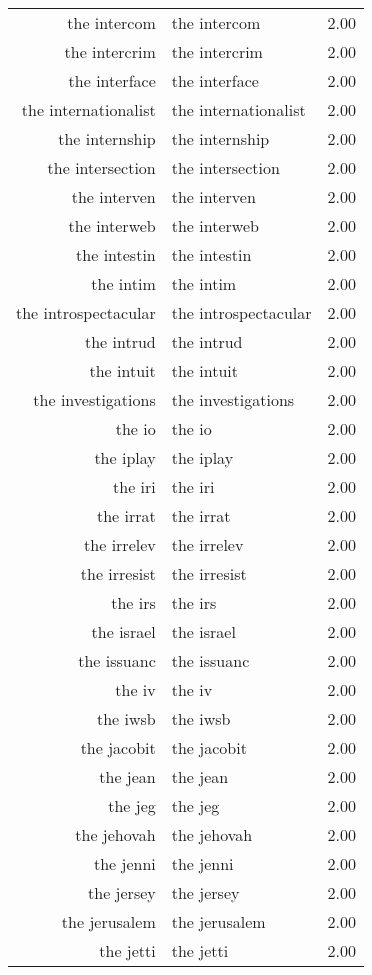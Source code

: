 \begin{table}[ht]
\begin{tabular}{rlr}
  the intercom & the intercom & 2.00 \\ 
  the intercrim & the intercrim & 2.00 \\ 
  the interface & the interface & 2.00 \\ 
  the internationalist & the internationalist & 2.00 \\ 
  the internship & the internship & 2.00 \\ 
  the intersection & the intersection & 2.00 \\ 
  the interven & the interven & 2.00 \\ 
  the interweb & the interweb & 2.00 \\ 
  the intestin & the intestin & 2.00 \\ 
  the intim & the intim & 2.00 \\ 
  the introspectacular & the introspectacular & 2.00 \\ 
  the intrud & the intrud & 2.00 \\ 
  the intuit & the intuit & 2.00 \\ 
  the investigations & the investigations & 2.00 \\ 
  the io & the io & 2.00 \\ 
  the iplay & the iplay & 2.00 \\ 
  the iri & the iri & 2.00 \\ 
  the irrat & the irrat & 2.00 \\ 
  the irrelev & the irrelev & 2.00 \\ 
  the irresist & the irresist & 2.00 \\ 
  the irs & the irs & 2.00 \\ 
  the israel & the israel & 2.00 \\ 
  the issuanc & the issuanc & 2.00 \\ 
  the iv & the iv & 2.00 \\ 
  the iwsb & the iwsb & 2.00 \\ 
  the jacobit & the jacobit & 2.00 \\ 
  the jean & the jean & 2.00 \\ 
  the jeg & the jeg & 2.00 \\ 
  the jehovah & the jehovah & 2.00 \\ 
  the jenni & the jenni & 2.00 \\ 
  the jersey & the jersey & 2.00 \\ 
  the jerusalem & the jerusalem & 2.00 \\ 
  the jetti & the jetti & 2.00 \\ 

\end{tabular}
\end{table}
